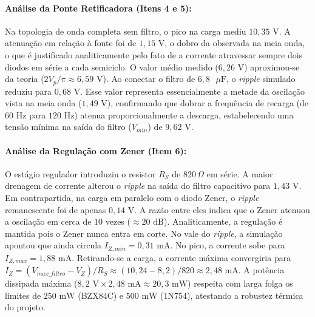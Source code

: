 \documentclass[11pt,a4paper]{article}
\begin{document}
\paragraph{Análise da Ponte Retificadora (Itens 4 e 5):}
Na topologia de onda completa sem filtro, o pico na carga mediu $10{,}35\text{ V}$. A atenuação em relação à fonte foi de $1{,}15\text{ V}$, o dobro da observada na meia onda, o que é justificado analiticamente pelo fato de a corrente atravessar sempre dois diodos em série a cada semiciclo. O valor médio medido ($6{,}26\text{ V}$) aproximou-se da teoria ($2V_p/\pi \approx 6{,}59\text{ V}$).
Ao conectar o filtro de $6{,}8\text{ }\mu\text{F}$, o \textit{ripple} simulado reduziu para $0{,}68\text{ V}$. Esse valor representa essencialmente a metade da oscilação vista na meia onda ($1{,}49\text{ V}$), confirmando que dobrar a frequência de recarga (de $60\text{ Hz}$ para $120\text{ Hz}$) atenua proporcionalmente a descarga, estabelecendo uma tensão mínima na saída do filtro ($V_{min}$) de $9{,}62\text{ V}$.

\paragraph{Análise da Regulação com Zener (Item 6):}
O estágio regulador introduziu o resistor $R_S$ de $820\,\Omega$ em série. A maior drenagem de corrente alterou o \textit{ripple} na saída do filtro capacitivo para $1{,}43\text{ V}$. Em contrapartida, na carga em paralelo com o diodo Zener, o \textit{ripple} remanescente foi de apenas $0{,}14\text{ V}$. A razão entre eles indica que o Zener atenuou a oscilação em cerca de $10$ vezes ($\approx 20\text{ dB}$).
Analiticamente, a regulação é mantida pois o Zener nunca entra em corte. No vale do \textit{ripple}, a simulação apontou que ainda circula $I_{Z,min} = 0{,}31\text{ mA}$. No pico, a corrente sobe para $I_{Z,max} = 1{,}88\text{ mA}$. Retirando-se a carga, a corrente máxima convergiria para $I_Z = (V_{max\_filtro} - V_Z)/R_S \approx (10{,}24 - 8{,}2)/820 \approx 2{,}48\text{ mA}$. A potência dissipada máxima ($8{,}2\text{ V} \times 2{,}48\text{ mA} \approx 20{,}3\text{ mW}$) respeita com larga folga os limites de $250\text{ mW}$ (BZX84C) e $500\text{ mW}$ (1N754), atestando a robustez térmica do projeto.
\end{document}
